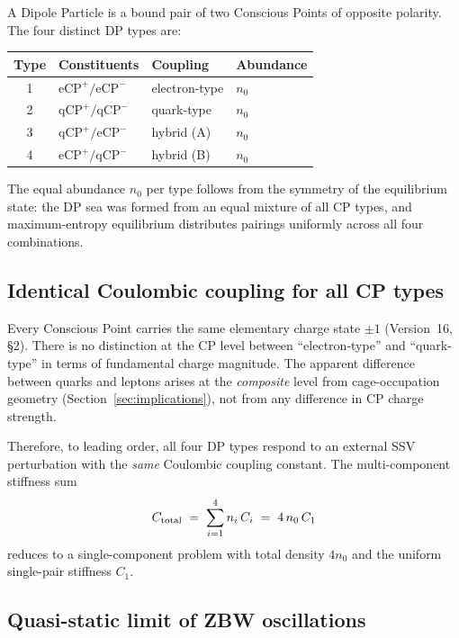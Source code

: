 \documentclass[12pt]{article}
\begin{document}
A Dipole Particle is a bound pair of two Conscious Points of opposite polarity.
The four distinct DP types are:
\begin{center}
\begin{tabular}{@{}clll@{}}
\toprule
Type & Constituents & Coupling & Abundance \\
\midrule
1 & $\text{eCP}^+/\text{eCP}^-$ & electron-type & $n_0$ \\
2 & $\text{qCP}^+/\text{qCP}^-$ & quark-type    & $n_0$ \\
3 & $\text{qCP}^+/\text{eCP}^-$ & hybrid (A)    & $n_0$ \\
4 & $\text{eCP}^+/\text{qCP}^-$ & hybrid (B)    & $n_0$ \\
\bottomrule
\end{tabular}
\end{center}
The equal abundance $n_0$ per type follows from the symmetry of the
equilibrium state: the DP sea was formed from an equal mixture of all CP
types, and maximum-entropy equilibrium distributes pairings uniformly across
all four combinations.

\subsection{Identical Coulombic coupling for all CP types}

Every Conscious Point carries the same elementary charge state $\pm 1$
(Version~16, \S 2).  There is no distinction at the CP level between
``electron-type'' and ``quark-type'' in terms of fundamental charge magnitude.
The apparent difference between quarks and leptons arises at the \emph{composite}
level from cage-occupation geometry (Section~\ref{sec:implications}), not from
any difference in CP charge strength.

Therefore, to leading order, all four DP types respond to an external SSV
perturbation with the \emph{same} Coulombic coupling constant.  The
multi-component stiffness sum
\begin{equation}
  C_{\rm total} \;=\; \sum_{i=1}^{4} n_i\, C_i
  \;=\; 4\, n_0\, C_1
  \label{eq:Ctotal}
\end{equation}
reduces to a single-component problem with total density $4n_0$ and the
uniform single-pair stiffness $C_1$.

\subsection{Quasi-static limit of ZBW oscillations}
\end{document}
